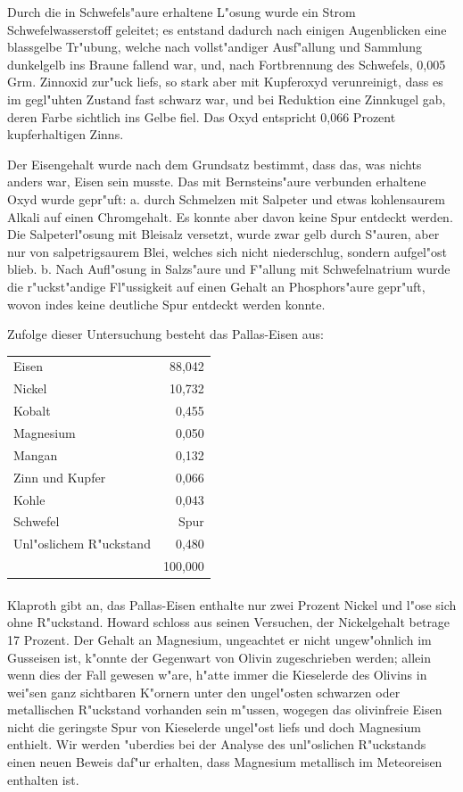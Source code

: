 \documentclass[a4paper, 11pt, oneside]{article}
\begin{document}
Durch die in Schwefels"aure erhaltene L"osung wurde ein Strom Schwefelwasserstoff geleitet; es entstand dadurch nach einigen Augenblicken eine blassgelbe Tr"ubung, welche nach vollst"andiger Ausf"allung und Sammlung dunkelgelb ins Braune fallend war, und, nach Fortbrennung des Schwefels, 0,005 Grm. Zinnoxid zur"uck liefs, so stark aber mit Kupferoxyd verunreinigt, dass es im gegl"uhten Zustand fast schwarz war, und bei Reduktion eine Zinnkugel gab, deren Farbe sichtlich ins Gelbe fiel. Das Oxyd entspricht 0,066 Prozent kupferhaltigen Zinns.

Der Eisengehalt wurde nach dem Grundsatz bestimmt, dass das, was nichts anders war, Eisen sein musste. Das mit Bernsteins"aure verbunden erhaltene Oxyd wurde gepr"uft: a. durch Schmelzen mit Salpeter und etwas kohlensaurem Alkali auf einen Chromgehalt. Es konnte aber davon keine Spur entdeckt werden. Die Salpeterl"osung mit Bleisalz versetzt, wurde zwar gelb durch S"auren, aber nur von salpetrigsaurem Blei, welches sich nicht niederschlug, sondern aufgel"ost blieb. b. Nach Aufl"osung in Salzs"aure und F"allung mit Schwefelnatrium wurde die r"uckst"andige Fl"ussigkeit auf einen Gehalt an Phosphors"aure gepr"uft, wovon indes keine deutliche Spur entdeckt werden konnte.

Zufolge dieser Untersuchung besteht das Pallas-Eisen aus:
\begin{center}
\begin{tabular}{ l r }
    Eisen & 88,042\\
    Nickel & 10,732\\
    Kobalt & 0,455\\
    Magnesium & 0,050\\
    Mangan & 0,132\\
    Zinn und Kupfer & 0,066\\
    Kohle & 0,043\\
    Schwefel & Spur\\
    Unl"oslichem R"uckstand & 0,480\\
    & 100,000\\
\end{tabular}
\end{center}
\paragraph{}
Klaproth gibt an, das Pallas-Eisen enthalte nur zwei Prozent Nickel und l"ose sich ohne R"uckstand. Howard schloss aus seinen Versuchen, der Nickelgehalt betrage 17 Prozent. Der Gehalt an Magnesium, ungeachtet er nicht ungew"ohnlich im Gusseisen ist, k"onnte der Gegenwart von Olivin zugeschrieben werden; allein wenn dies der Fall gewesen w"are, h"atte immer die Kieselerde des Olivins in wei"sen ganz sichtbaren K"ornern unter den ungel"osten schwarzen oder metallischen R"uckstand vorhanden sein m"ussen, wogegen das olivinfreie Eisen nicht die geringste Spur von Kieselerde ungel"ost liefs und doch Magnesium enthielt. Wir werden "uberdies bei der Analyse des unl"oslichen R"uckstands einen neuen Beweis daf"ur erhalten, dass Magnesium metallisch im Meteoreisen enthalten ist.
\end{document}
